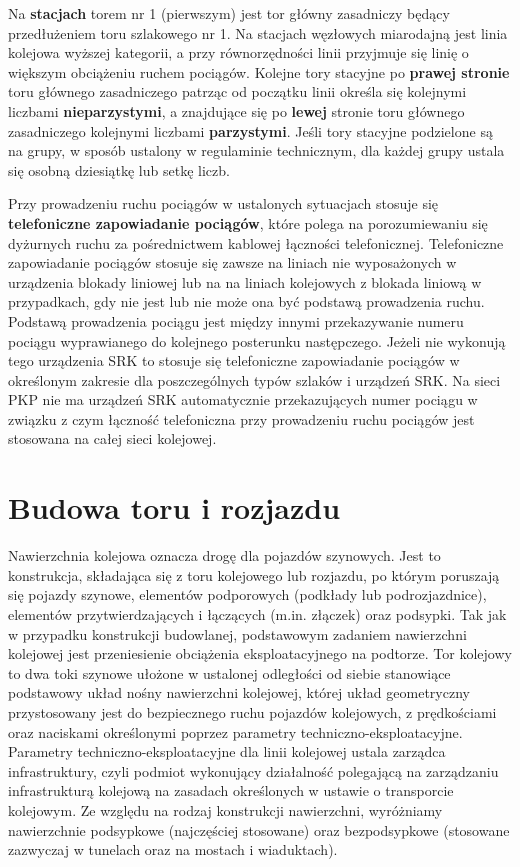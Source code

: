 Na \textbf{stacjach} torem nr 1 (pierwszym) jest tor główny zasadniczy będący przedłużeniem toru szlakowego nr 1. Na stacjach węzłowych miarodajną jest linia kolejowa wyższej kategorii, a przy równorzędności linii przyjmuje się linię o większym obciążeniu ruchem pociągów. Kolejne tory stacyjne po \textbf{prawej stronie} toru głównego zasadniczego patrząc od początku linii określa się kolejnymi liczbami \textbf{nieparzystymi}, a znajdujące się po \textbf{lewej} stronie toru głównego zasadniczego kolejnymi liczbami \textbf{parzystymi}. Jeśli tory stacyjne podzielone są na grupy, w sposób ustalony w regulaminie technicznym, dla każdej grupy ustala się osobną dziesiątkę lub setkę liczb.

Przy prowadzeniu ruchu pociągów w ustalonych sytuacjach stosuje się \textbf{telefoniczne zapowiadanie pociągów}, które polega na porozumiewaniu się dyżurnych ruchu za pośrednictwem kablowej łączności telefonicznej. Telefoniczne zapowiadanie pociągów stosuje się zawsze na liniach nie wyposażonych w urządzenia blokady liniowej lub na na liniach kolejowych z blokada liniową w przypadkach, gdy nie jest lub nie może ona być podstawą prowadzenia ruchu. Podstawą prowadzenia pociągu jest między innymi przekazywanie numeru pociągu wyprawianego do kolejnego posterunku następczego. Jeżeli nie wykonują tego urządzenia SRK to stosuje się telefoniczne zapowiadanie pociągów w określonym zakresie dla poszczególnych typów szlaków i urządzeń SRK. 
Na sieci PKP nie ma urządzeń SRK automatycznie przekazujących numer pociągu w związku z czym łączność telefoniczna przy prowadzeniu ruchu pociągów jest stosowana na całej sieci kolejowej.

\section{Budowa toru i rozjazdu}

Nawierzchnia kolejowa oznacza drogę dla pojazdów szynowych. Jest to konstrukcja, składająca się z toru kolejowego lub rozjazdu, po którym poruszają się pojazdy szynowe, elementów podporowych (podkłady lub podrozjazdnice), elementów przytwierdzających i łączących (m.in. złączek) oraz podsypki. Tak jak w przypadku konstrukcji budowlanej, podstawowym zadaniem nawierzchni kolejowej jest przeniesienie obciążenia eksploatacyjnego na podtorze.
Tor kolejowy to dwa toki szynowe ułożone w ustalonej odległości od siebie stanowiące podstawowy układ nośny nawierzchni kolejowej, której układ geometryczny przystosowany jest do bezpiecznego ruchu pojazdów kolejowych, z prędkościami oraz naciskami określonymi poprzez parametry techniczno-eksploatacyjne. Parametry techniczno-eksploatacyjne dla linii kolejowej ustala zarządca infrastruktury, czyli podmiot wykonujący działalność polegającą na zarządzaniu infrastrukturą kolejową na zasadach określonych w ustawie o transporcie kolejowym.
Ze względu na rodzaj konstrukcji nawierzchni, wyróżniamy nawierzchnie podsypkowe (najczęściej stosowane) oraz bezpodsypkowe (stosowane zazwyczaj w tunelach oraz na mostach i wiaduktach). 

